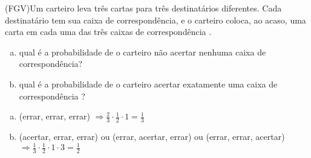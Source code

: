 \begin{ex}
(FGV)Um carteiro leva três cartas para três destinatários diferentes. Cada destinatário tem sua caixa de correspondência, e o carteiro coloca, ao acaso, uma carta em cada uma das três caixas de correspondência .
   \begin{enumerate}[(a)]
   \item qual é a probabilidade de o carteiro não acertar nenhuma caixa de correspondência?
   \item qual é a probabilidade de o carteiro acertar exatamente uma caixa de correspondência ?
   \end{enumerate}
     \begin{sol}
        \phantom{A}
        \begin{enumerate}  [(a)]
            \item (errar, errar, errar) $\Longrightarrow\frac{2}{3}\cdot\frac{1}{2}\cdot1=\frac{1}{3}$
            \item (acertar, errar, errar)  ou (errar, acertar, errar) ou (errar, errar, acertar) \\ $\Longrightarrow \frac{1}{3}\cdot\frac{1}{2}\cdot1\cdot3=\frac{1}{2}$
        \end{enumerate}
     \end{sol}
\end{ex}